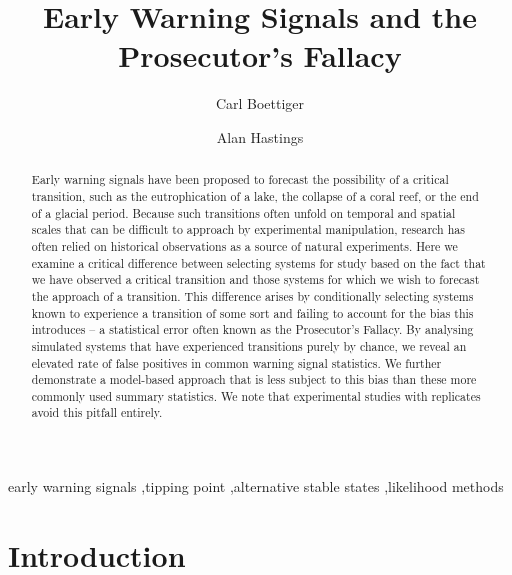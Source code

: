 \documentclass[authoryear,review,12pt]{elsarticle}
\begin{document}
\begin{frontmatter}
  \title{Early Warning Signals and the Prosecutor's Fallacy}
  \author[cpb]{Carl Boettiger}
  \author[esp]{Alan Hastings}
  \address[cpb]{Center for Population Biology, 1 Shields Avenue, University of California, Davis, CA, 95616 United States.}
  \address[esp]{Department of Environmental Science and Policy, University of California, Davis} 


\begin{abstract}

Early warning signals have been proposed to forecast the possibility
of a critical transition, such as the eutrophication of a lake, the
collapse of a coral reef, or the end of a glacial period.  Because such
transitions often unfold on temporal and spatial scales that can be
difficult to approach by experimental manipulation, research has often
relied on historical observations as a source of natural experiments.
Here we examine a critical difference between selecting systems for
study based on the fact that we have observed a critical transition
and those systems for which we wish to forecast the approach of a
transition. This difference arises by conditionally selecting systems
known to experience a transition of some sort and failing to account
for the bias this introduces -- a statistical error often known as
the Prosecutor's Fallacy.  By analysing simulated systems that have
experienced transitions purely by chance, we reveal an elevated rate
of false positives in common warning signal statistics. We further
demonstrate a model-based approach that is less subject to this
bias than these more commonly used summary statistics.  We note that
experimental studies with replicates avoid this pitfall entirely.


\end{abstract}

  \begin{keyword}
early warning signals \sep tipping point \sep alternative stable states \sep likelihood methods 
   \end{keyword}
 \end{frontmatter}

\section{Introduction}
\end{document}
